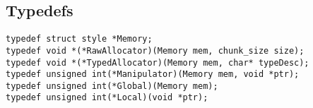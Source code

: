 \subsection{Typedefs} 
\begin{verbatim}
typedef struct style *Memory;
typedef void *(*RawAllocator)(Memory mem, chunk_size size);
typedef void *(*TypedAllocator)(Memory mem, char* typeDesc);
typedef unsigned int(*Manipulator)(Memory mem, void *ptr);
typedef unsigned int(*Global)(Memory mem);
typedef unsigned int(*Local)(void *ptr);
\end{verbatim}

